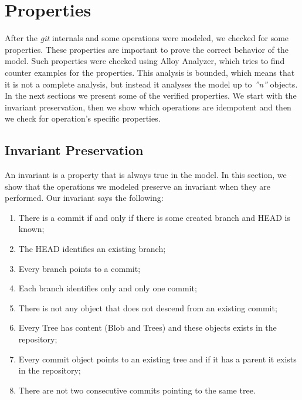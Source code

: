\chapter{Properties}
After the \emph{git} internals and some operations were modeled,
we checked for some properties. These properties are important to
prove the correct behavior of the model. Such properties were checked using
Alloy Analyzer, which tries to find counter examples for the
properties. This analysis is bounded, which means that it is not a
complete analysis, but instead it analyses the model up to
\emph{''n''} objects.\\

In the next sections we present some of the verified properties. We start with
the invariant preservation, then we show which operations are
idempotent and then we check for operation's specific properties.

\section{Invariant Preservation}
An invariant is a property that is always true in the model. In this
section, we show that the operations we modeled preserve an invariant
when they are performed. Our invariant says the following:
\begin{enumerate}
   \item There is a commit if and only if there is some created branch
   and HEAD is known;
   \item The HEAD identifies an existing branch;
   \item Every branch points to a commit;
   \item Each branch identifies only and only one commit;
   \item There is not any object that does not descend from an existing
   commit;
   \item Every Tree has content (Blob and Trees) and these objects
   exists in the repository;
   \label{item:treeContainsSome}
   \item Every commit object points to an existing tree and if it has
   a parent it exists in the repository;
   \item There are not two consecutive commits pointing to the same tree.
\end{enumerate}

